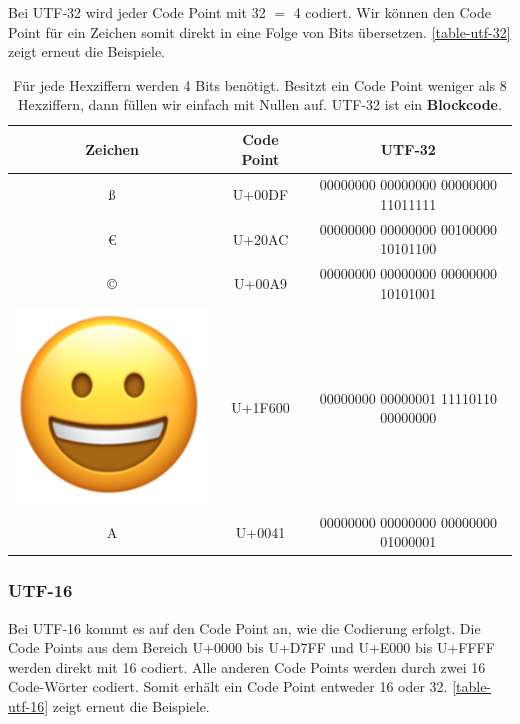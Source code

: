 Bei UTF-32 wird jeder Code Point mit \qty{32}{\bit} $=$ \qty{4}{\byte} codiert. Wir können den Code Point für ein Zeichen somit direkt in eine Folge von Bits übersetzen. \autoref{table-utf-32} zeigt erneut die Beispiele.

\begin{table}[htb]
\centering
\begin{tabular}{|c|c|c|}
\hline
Zeichen & Code Point & UTF-32 \\ \hline
ß     	& U+00DF	& 00000000 00000000 00000000 11011111\\ \hline
€     	& U+20AC     	& 00000000 00000000 00100000 10101100\\ \hline
©     	& U+00A9     	& 00000000 00000000 00000000 10101001\\ \hline
\rule{0pt}{15pt} \includegraphics[scale=0.1]{emoji_grinning_face} & U+1F600	& 00000000 00000001 11110110 00000000\\ \hline
A & U+0041		& 00000000 00000000 00000000 01000001\\ \hline
\end{tabular}
\caption{Für jede Hexziffern werden \num{4} Bits benötigt. Besitzt ein Code Point weniger als \num{8} Hexziffern, dann füllen wir einfach mit Nullen auf. UTF-32 ist ein \textbf{Blockcode}.}
\label{table-utf-32}
\end{table}

\subsubsection{UTF-16}

Bei UTF-16 kommt es auf den Code Point an, wie die Codierung erfolgt. Die Code Points aus dem Bereich U+0000 bis U+D7FF und U+E000 bis U+FFFF werden direkt mit \qty{16}{\bit} codiert. Alle anderen Code Points werden durch zwei \qty{16}{\bit} Code-Wörter codiert. Somit erhält ein Code Point entweder \qty{16}{\bit} oder \qty{32}{\bit}. \autoref{table-utf-16} zeigt erneut die Beispiele.

